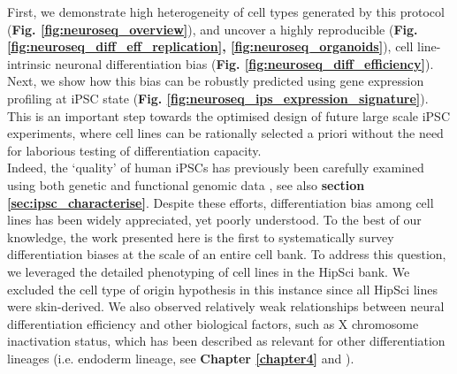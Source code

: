 First, we demonstrate high heterogeneity of cell types generated by this protocol (\textbf{Fig. \ref{fig:neuroseq_overview}}), and uncover a highly reproducible (\textbf{Fig. \ref{fig:neuroseq_diff_eff_replication}, \ref{fig:neuroseq_organoids}}), cell line-intrinsic neuronal differentiation bias (\textbf{Fig. \ref{fig:neuroseq_diff_efficiency}}).
Next, we show how this bias can be robustly predicted using gene expression profiling at iPSC state (\textbf{Fig. \ref{fig:neuroseq_ips_expression_signature}}). 
This is an important step towards the optimised design of future large scale iPSC experiments, where cell lines can be rationally selected a priori without the need for laborious testing of differentiation capacity. \\

Indeed, the `quality' of human iPSCs has previously been carefully examined using both genetic and functional genomic data \cite{muller2011bioinformatic, international2018assessment, tsankov2015qpcr, bock2011reference}, see also \textbf{section
\ref{sec:ipsc_characterise}}. 
Despite these efforts, differentiation bias among cell lines has been widely appreciated, yet poorly understood. 
To the best of our knowledge, the work presented here is the first to systematically survey differentiation biases at the scale of an entire cell bank. 
To address this question, we leveraged the detailed phenotyping of cell lines in the HipSci bank.
We excluded the cell type of origin hypothesis \cite{hu2016effects} in this instance since all HipSci lines were skin-derived.
We also observed relatively weak relationships between neural differentiation efficiency and other biological factors, such as X chromosome inactivation status, which has been described as relevant for other differentiation lineages (i.e. endoderm lineage, see \textbf{Chapter
\ref{chapter4}}
and \cite{cuomo2020single}).
\\

